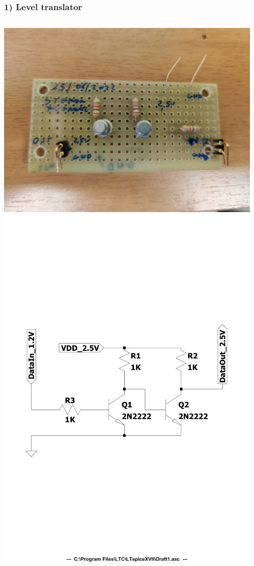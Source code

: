 \documentclass[aspectratio=169]{beamer}
\begin{document}
	
	\begin{frame}
		\frametitle{1) Level translator}
		\begin{columns}
			\begin{center}
				\includegraphics[width=0.8 \textwidth]{IMG/level_translator_front-min.jpg}
				\includegraphics[width=0.8 \textwidth]{IMG/Diagram_cropped.pdf}
			\end{center}
			\begin{center}

\end{center}
\end{columns}
\end{frame}
\end{document}
